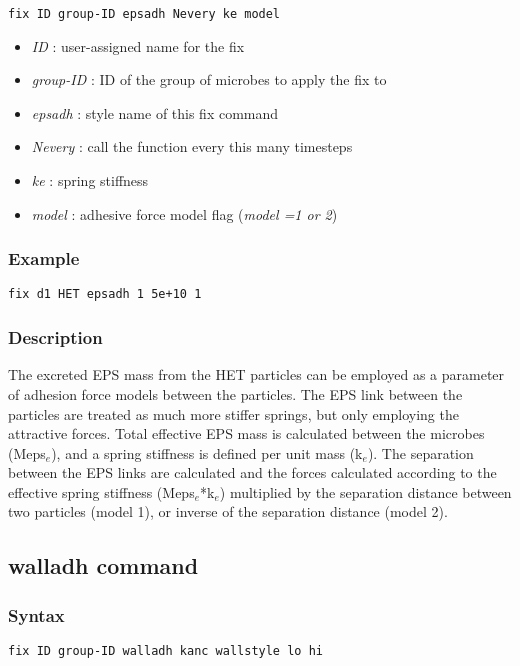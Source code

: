 \documentclass[11pt,a4paper,openright]{article}
\begin{document}
\begin{Verbatim}[frame=single]
	fix ID group-ID epsadh Nevery ke model
\end{Verbatim}

\begin{itemize}
\item
	{\it ID }: user-assigned name for the fix
\item
	{\it group-ID }: ID of the group of microbes to apply the fix to
\item
	{\it epsadh }: style name of this fix command
\item
	{\it Nevery }: call the function every this many timesteps
\item
	{\it ke }: spring stiffness
\item
	{\it model }: adhesive force model flag ({\it model =1 or 2})

\end{itemize}

\subsubsection*{Example}

\begin{Verbatim}[frame=single]
	fix d1 HET epsadh 1 5e+10 1
\end{Verbatim}

\subsubsection*{Description}

The excreted EPS mass from the HET particles can be employed as a parameter of adhesion force models between the particles. The EPS link between the particles are treated as much more stiffer springs, but only employing the attractive forces. Total effective EPS mass is calculated between the microbes (Meps$_{e}$), and a spring stiffness is defined per unit mass (k$_{e}$). The separation between the EPS links are calculated and the forces calculated according to the effective spring stiffness (Meps$_{e}$*k$_{e}$) multiplied by the separation distance between two particles (model 1), or inverse of the separation distance (model 2). 

\newpage
\subsection{walladh command}

\subsubsection*{Syntax}
\begin{Verbatim}[frame=single]
	fix ID group-ID walladh kanc wallstyle lo hi
\end{Verbatim}
\end{document}
